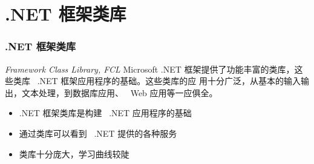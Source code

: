 
\section{.NET 框架类库}

\begin{frame}
\frametitle{.NET 框架类库}

\begin{block}{\textit{Framework Class Library, FCL}}
  \CJKindent Microsoft .NET 框架提供了功能丰富的类库，这些类库 ~.NET 框架应用程序的基础。这些类库的应
  用十分广泛，从基本的输入输出，文本处理，到数据库应用、 ~Web 应用等一应俱全。
\end{block}

\begin{itemize}
\item .NET 框架类库是构建 ~.NET 应用程序的基础
\item 通过类库可以看到 ~.NET 提供的各种服务
\item 类库十分庞大，学习曲线较陡
\end{itemize}

\end{frame}

